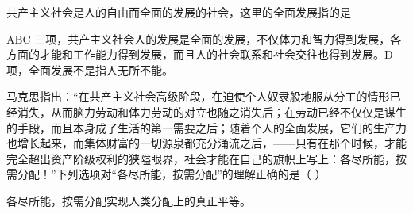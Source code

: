 \question 共产主义社会是人的自由而全面的发展的社会，这里的全面发展指的是
\par{}
\begin{solution}ABC
三项，共产主义社会人的发展是全面的发展，不仅体力和智力得到发展，各方面的才能和工作能力得到发展，而且人的社会联系和社会交往也得到发展。D
项，全面发展不是指人无所不能。
\end{solution}
\question 马克思指出：``在共产主义社会高级阶段，在迫使个人奴隶般地服从分工的情形已经消失，从而脑力劳动和体力劳动的对立也随之消失后；在劳动已经不仅仅是谋生的手段，而且本身成了生活的第一需要之后；随着个人的全面发展，它们的生产力也增长起来，而集体财富的一切源泉都充分涌流之后，------只有在那个时候，才能完全超出资产阶级权利的狭隘眼界，社会才能在自己的旗帜上写上：各尽所能，按需分配！''下列选项对``各尽所能，按需分配''的理解正确的是（
）
\par{}
\begin{solution}各尽所能，按需分配实现人类分配上的真正平等。
\end{solution}

